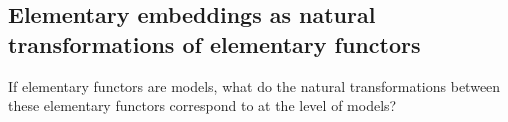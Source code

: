 


%
%

\subsection{Elementary embeddings as natural transformations of elementary functors}

If elementary functors are models, what do the natural transformations between these elementary functors correspond to at the level of models?

